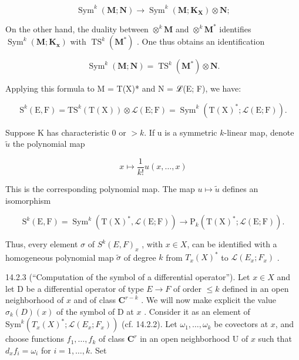 \[
\operatorname{Sym} ^ {k} (\mathbf {M}; \mathbf {N}) \rightarrow \operatorname{Sym} ^ {k} (\mathbf {M}; \mathbf {K} _ {\mathbf {X}}) \otimes \mathbf {N};
\]

On the other hand, the duality between \(\otimes^{k}\mathbf{M}\) and \(\otimes^{k}\mathbf{M}^{*}\) identifies \(\operatorname{Sym}^{k}(\mathbf{M};\mathbf{K}_{\mathbf{x}})\) with \(\operatorname{TS}^{k}(\mathbf{M}^{*})\) . One thus obtains an identification

\[
\operatorname{Sym} ^ {k} (\mathbf {M}; \mathbf {N}) = \operatorname{TS} ^ {k} (\mathbf {M} ^ {*}) \otimes \mathbf {N}.
\]

Applying this formula to M = T(X)* and N = ℒ(E; F), we have:

\[
\mathrm{S} ^ {k} (\mathrm{E}, \mathrm{F}) = \mathrm{T} \mathrm{S} ^ {k} (\mathrm{T} (\mathrm{X})) \otimes \mathscr {L} (\mathrm{E}; \mathrm{F}) = \operatorname{Sym} ^ {k} (\mathrm{T} (\mathrm{X}) ^ {*}; \mathscr {L} (\mathrm{E}; \mathrm{F})).
\]

Suppose K has characteristic 0 or \(>k\). If u is a symmetric \(k\)-linear map, denote \(\tilde{u}\) the polynomial map

\[
x \mapsto \frac {1}{k !} u (x, \dots , x)
\]

This is the corresponding polynomial map. The map \(u \mapsto \tilde{u}\) defines an isomorphism

\[
\mathrm{S} ^ {k} (\mathrm{E}, \mathrm{F}) = \operatorname{Sym} ^ {k} (\mathrm{T} (\mathrm{X}) ^ {*}, \mathscr {L} (\mathrm{E}; \mathrm{F})) \rightarrow \mathrm{P} _ {k} (\mathrm{T} (\mathrm{X}) ^ {*}; \mathscr {L} (\mathrm{E}; \mathrm{F})).
\]

Thus, every element \(\sigma\) of \(S^{k}(E,F)_{x}\) , with \(x\in X\), can be identified with a homogeneous polynomial map \(\tilde{\sigma}\) of degree \(k\) from \(T_{x}(X)^{*}\) to \(\mathcal{L}(E_{x};F_{x})\) .

14.2.3 (“Computation of the symbol of a differential operator”). Let \(x \in X\) and let D be a differential operator of type \(E \to F\) of order \(\leqslant k\) defined in an open neighborhood of \(x\) and of class \(\mathbf{C}^{r-k}\) . We will now make explicit the value \(\sigma_k(D)(x)\) of the symbol of D at \(x\) . Consider it as an element of \(\text{Sym}^k(T_x(X)^*; \mathcal{L}(E_x; F_x))\) (cf. 14.2.2). Let \(\omega_1, \ldots, \omega_k\) be covectors at \(x\), and choose functions \(f_1, \ldots, f_k\) of class \(\mathbf{C}^r\) in an open neighborhood U of \(x\) such that \(d_x f_i = \omega_i\) for \(i = 1, \ldots, k\). Set

